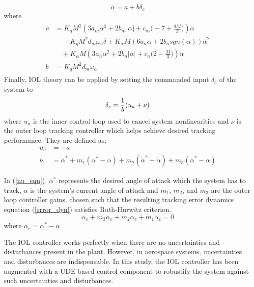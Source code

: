 \documentclass[conference]{IEEEtran}
\begin{document}
		\begin{equation}
			\dddot{\alpha} = a + b\delta_c \label{rak_eq_2}
		\end{equation}
		where 
		\begin{eqnarray}
			\begin{aligned}
				a &= K_qM^2(3a_m\alpha^2+2b_m|\alpha|+c_m\Big(-7+\frac{8M}{3}\Big))\dot{\alpha} \\ 
				&\quad -K_qM^2d_m\omega_a\delta+K_\alpha M(6a_n\alpha+2b_nsgn(\alpha))\dot{\alpha}^2\\ 
				&\quad+K_\alpha M(3a_n\alpha^2+2b_n|\alpha|+c_n\Big(2-\frac{M}{3}\Big))\ddot{\alpha} \\
				b &= K_q M^2d_m\omega_a \nonumber
			\end{aligned}
		\end{eqnarray}
		Finally, IOL theory can be applied by setting the commanded input $\delta_c$ of the system to 
		\begin{equation}
			\delta_c = \frac{1}{b}(u_a+\nu) \\ \label{iol_control}
		\end{equation}
		where $u_a$ is the inner control loop used to cancel system nonlinearities and $\nu$ is the outer loop tracking controller which helps achieve desired tracking performance. They are defined as;
		\begin{align}
				u_a &= -a \label{ua_eqn}\\
				\nu &= \dddot{\alpha}^\ast+m_1(\alpha^\ast-\alpha) + m_2(\dot{\alpha}^\ast-\dot{\alpha}) + m_3(\ddot{\alpha}^\ast-\ddot{\alpha}) \label{nu_eqn} 
		\end{align}
		
		In (\ref{nu_eqn}), $\alpha^*$ represents the desired angle of attack which the system has to track, $\alpha$ is the system's current angle of attack and $m_1$, $m_2$, and $m_3$ are the outer loop controller gains, chosen such that the resulting tracking error dynamics equation (\ref{error_dyn}) satisfies Ruth-Hurwitz criterion.
		\begin{equation}
			\dddot{\alpha}_e + m_3\ddot{\alpha}_e + m_2\dot{\alpha}_e + m_1\alpha_e = 0 \label{error_dyn}
		\end{equation}
		where $\alpha_e = \alpha^\ast - \alpha$
		
		The IOL controller works perfectly when there are no uncertainties and disturbances present in the plant. However, in aerospace systems, uncertainties and disturbances are indispensable. In this study, the IOL controller has been augmented with a UDE based control component to robustify the system against such uncertainties and disturbances.
	
\end{document}

